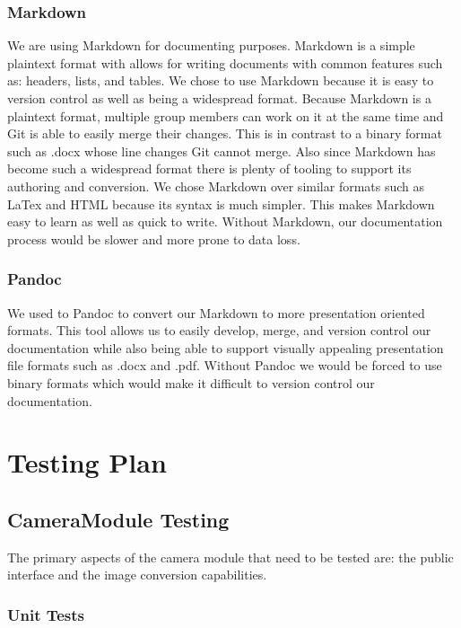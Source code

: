\documentclass[12pt]{article}
\begin{document}
\subsubsection{Markdown}\label{markdown}

We are using Markdown for documenting purposes. Markdown is a simple
plaintext format with allows for writing documents with common features
such as: headers, lists, and tables. We chose to use Markdown because it
is easy to version control as well as being a widespread format. Because
Markdown is a plaintext format, multiple group members can work on it at
the same time and Git is able to easily merge their changes. This is in
contrast to a binary format such as .docx whose line changes Git cannot
merge. Also since Markdown has become such a widespread format there is
plenty of tooling to support its authoring and conversion. We chose
Markdown over similar formats such as LaTex and HTML because its syntax
is much simpler. This makes Markdown easy to learn as well as quick to
write. Without Markdown, our documentation process would be slower and
more prone to data loss.

\subsubsection{Pandoc}\label{pandoc}

We used to Pandoc to convert our Markdown to more presentation oriented
formats. This tool allows us to easily develop, merge, and version
control our documentation while also being able to support visually
appealing presentation file formats such as .docx and .pdf. Without
Pandoc we would be forced to use binary formats which would make it
difficult to version control our documentation.

\section{Testing Plan}\label{testing-plan}

\subsection{CameraModule Testing}\label{cameramodule-testing}

The primary aspects of the camera module that need to be tested are: the
public interface and the image conversion capabilities.

\subsubsection{Unit Tests}\label{unit-tests}
\end{document}
